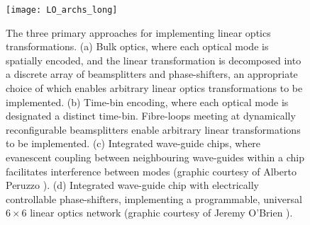 \pubmode
	\begin{figure}[!htbp]
	\texttt{[image: LO\_archs\_long]}
	\caption{The three primary approaches for implementing linear optics transformations. (a) Bulk optics, where each optical mode is spatially encoded, and the linear transformation is decomposed into a discrete array of beamsplitters and phase-shifters, an appropriate choice of which enables arbitrary linear optics transformations to be implemented. (b) Time-bin encoding, where each optical mode is designated a distinct time-bin. Fibre-loops meeting at dynamically reconfigurable beamsplitters enable arbitrary linear transformations to be implemented. (c) Integrated wave-guide chips, where evanescent coupling between neighbouring wave-guides within a chip facilitates interference between modes (graphic courtesy of Alberto Peruzzo \cite{bib:PeruzzoQW}). (d) Integrated wave-guide chip with electrically controllable phase-shifters, implementing a programmable, universal \mbox{$6\times 6$} linear optics network (graphic courtesy of Jeremy O'Brien \cite{bib:UniversalLOOBrien}).} \label{fig:LO_archs}
	\end{figure}
\else
